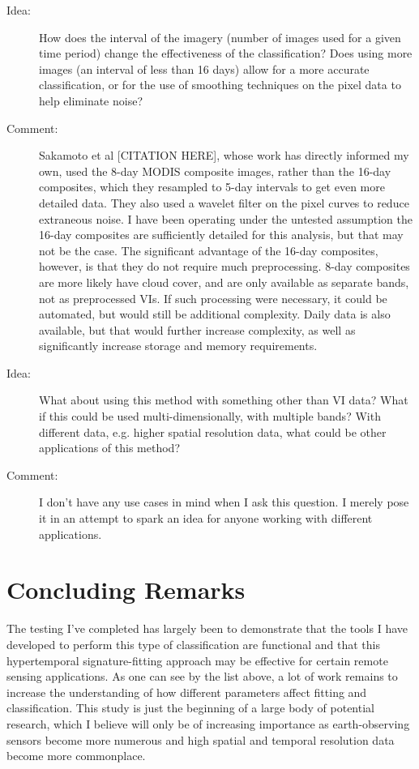 \begin{description}
\item[Idea:] How does the interval of the imagery (number of images used for a given time period) change the effectiveness of the classification? Does using more images (an interval of less than 16 days) allow for a more accurate classification, or for the use of smoothing techniques on the pixel data to help eliminate noise?

\item[Comment:] Sakamoto et al [CITATION HERE], whose work has directly informed my own, used the 8-day MODIS composite images, rather than the 16-day composites, which they resampled to 5-day intervals to get even more detailed data. They also used a wavelet filter on the pixel curves to reduce extraneous noise. I have been operating under the untested assumption the 16-day composites are sufficiently detailed for this analysis, but that may not be the case. The significant advantage of the 16-day composites, however, is that they do not require much preprocessing. 8-day composites are more likely have cloud cover, and are only available as separate bands, not as preprocessed VIs. If such processing were necessary, it could be automated, but would still be additional complexity. Daily data is also available, but that would further increase complexity, as well as significantly increase storage and memory requirements.

\item[Idea:] What about using this method with something other than VI data? What if this could be used multi-dimensionally, with multiple bands? With different data, e.g. higher spatial resolution data, what could be other applications of this method?

\item[Comment:] I don’t have any use cases in mind when I ask this question. I merely pose it in an attempt to spark an idea for anyone working with different applications.
\end{description}

\section{Concluding Remarks}

The testing I’ve completed has largely been to demonstrate that the tools I have developed to perform this type of classification are functional and that this hypertemporal signature-fitting approach may be effective for certain remote sensing applications. As one can see by the list above, a lot of work remains to increase the understanding of how different parameters affect fitting and classification. This study is just the beginning of a large body of potential research, which I believe will only be of increasing importance as earth-observing sensors become more numerous and high spatial and temporal resolution data become more commonplace.